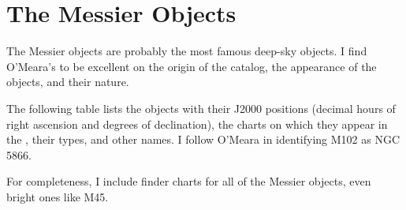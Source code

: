 
\chapter*{The Messier Objects}

The Messier objects are probably the most famous deep-sky objects. I find O’Meara’s  to be excellent  on the origin of the catalog, the appearance of the objects, and their nature.

The following table lists the objects with their J2000 positions (decimal hours of right ascension and degrees of declination), the charts on which they appear in the {\PSA}, their types, and other names. I follow O’Meara in identifying M102 as NGC 5866.

For completeness, I include finder charts for all of the Messier objects, even bright ones like M45.


\clearpage

